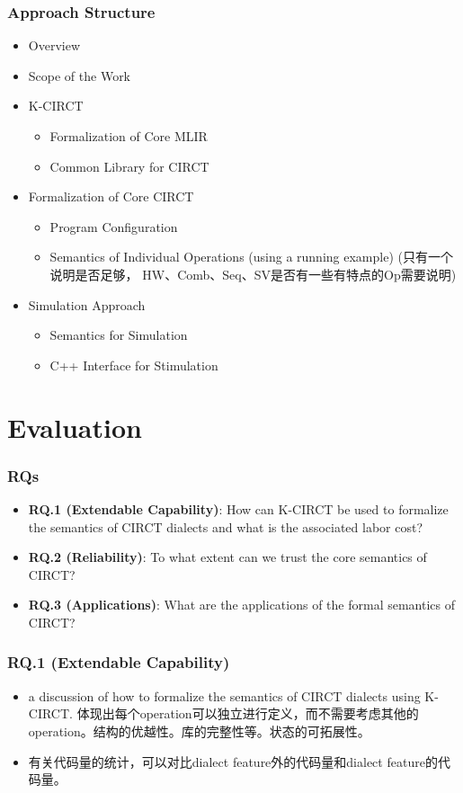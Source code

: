 \documentclass{beamer}
\begin{document}
\begin{frame}
    \frametitle{Approach Structure}
    \begin{itemize}
        \item Overview
        \item Scope of the Work
        \item K-CIRCT
        \begin{itemize}
            \item Formalization of Core MLIR
            \item Common Library for CIRCT
        \end{itemize}
        \item Formalization of Core CIRCT 
        \begin{itemize}
            \item Program Configuration
            \item Semantics of Individual Operations (using a running example) (只有一个说明是否足够， HW、Comb、Seq、SV是否有一些有特点的Op需要说明)
        \end{itemize}
        \item Simulation Approach
        \begin{itemize}
            \item Semantics for Simulation
            \item C++ Interface for Stimulation
        \end{itemize}
    \end{itemize}
\end{frame}

\section{Evaluation}
\begin{frame}
    \frametitle{RQs}
    \begin{itemize}
        \item \textbf{RQ.1 (Extendable Capability)}: How can K-CIRCT be used to formalize the semantics of CIRCT dialects and what is the associated labor cost?
        \item \textbf{RQ.2 (Reliability)}: To what extent can we trust the core semantics of CIRCT?
        \item \textbf{RQ.3 (Applications)}: What are the applications of the formal semantics of CIRCT?
    \end{itemize}
\end{frame}

\begin{frame}
    \frametitle{RQ.1 (Extendable Capability)}
    \begin{itemize}
        \item a discussion of how to formalize the semantics of CIRCT dialects using K-CIRCT. 体现出每个operation可以独立进行定义，而不需要考虑其他的operation。结构的优越性。库的完整性等。状态的可拓展性。
        \item 有关代码量的统计，可以对比dialect feature外的代码量和dialect feature的代码量。
    \end{itemize}
\end{frame}
\end{document}
